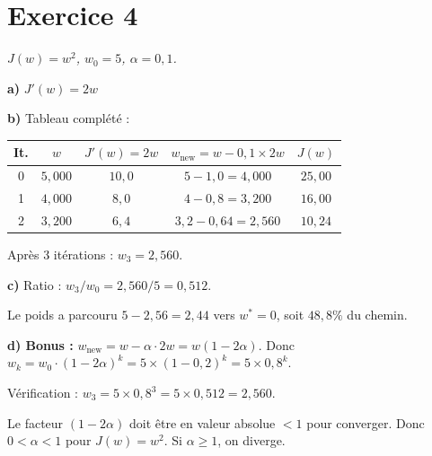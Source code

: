 \section*{Exercice 4 \hfill \exofondamental}
\textit{$J(w) = w^2$, $w_0 = 5$, $\alpha = 0{,}1$.}

\separateur

\textbf{a)} $J'(w) = \boxed{2w}$

\textbf{b)} Tableau compl\'{e}t\'{e} :

\begin{center}
\renewcommand{\arraystretch}{1.3}
\begin{tabular}{c|c|c|c|c}
    \toprule
    It. & $w$ & $J'(w) = 2w$ & $w_{\text{new}} = w - 0{,}1 \times 2w$ & $J(w)$ \\
    \midrule
    0 & $5{,}000$ & $10{,}0$ & $5 - 1{,}0 = 4{,}000$ & $25{,}00$ \\
    1 & $4{,}000$ & $8{,}0$  & $4 - 0{,}8 = 3{,}200$ & $16{,}00$ \\
    2 & $3{,}200$ & $6{,}4$  & $3{,}2 - 0{,}64 = 2{,}560$ & $10{,}24$ \\
    \bottomrule
\end{tabular}
\end{center}

Apr\`{e}s 3 it\'{e}rations : $w_3 = 2{,}560$.

\textbf{c)} Ratio : $w_3 / w_0 = 2{,}560 / 5 = \boxed{0{,}512}$.

Le poids a parcouru $5 - 2{,}56 = 2{,}44$ vers $w^* = 0$, soit $48{,}8\%$ du chemin.

\textbf{d) Bonus :} $w_{\text{new}} = w - \alpha \cdot 2w = w(1 - 2\alpha)$.
Donc $w_k = w_0 \cdot (1 - 2\alpha)^k = 5 \times (1 - 0{,}2)^k = 5 \times 0{,}8^k$.

V\'{e}rification : $w_3 = 5 \times 0{,}8^3 = 5 \times 0{,}512 = 2{,}560$. \checkmark

\begin{retenirbox}
    Le facteur $(1 - 2\alpha)$ doit \^{e}tre en valeur absolue $< 1$ pour converger.
    Donc $0 < \alpha < 1$ pour $J(w) = w^2$. Si $\alpha \geq 1$, on diverge.
\end{retenirbox}

